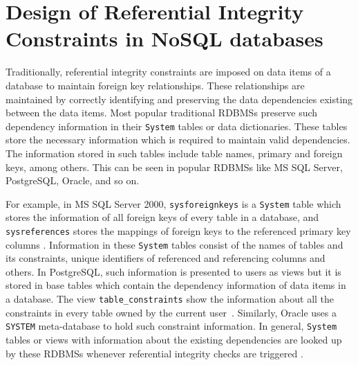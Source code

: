 \chapter{Design of Referential Integrity Constraints in NoSQL
databases} \label{c:solutions}

Traditionally,   referential
integrity constraints are imposed on data items of a database to maintain
foreign key relationships.    These relationships are
 maintained by correctly identifying and preserving the data dependencies 
 existing between the data items.   
Most popular traditional \acp{RDBMS}
preserve such dependency information in their \texttt{System} tables or data
dictionaries.     These tables store the necessary information  which is required
to maintain valid dependencies.    The information stored in such tables include table
names,    primary and foreign keys,  among others.   
This can be seen in popular \acp{RDBMS} like  MS SQL Server,    PostgreSQL,  
Oracle,   and so on.     

For example,    in MS SQL Server 2000,   \texttt{sysforeignkeys} is a
\texttt{System} table which stores the information of all foreign keys of every
table in a database,   and \texttt{sysreferences} stores the mappings of  foreign
keys to the referenced primary key columns \citep{msdn}.  Information in these
\texttt{System} tables consist of  the names of tables and its constraints, 
unique identifiers of referenced and referencing columns and others.  In
PostgreSQL,   such information is presented to users as views but it is stored in
base tables which contain the dependency information of data items in a
database.  The view \texttt{table\_constraints} show the information about all
the constraints in every table owned by the current user~\citep{postgres}. 
Similarly,   Oracle uses a \texttt{SYSTEM} meta-database to hold such constraint
information.   In general,   \texttt{System} tables or views with information
about the existing dependencies  are looked up by these \acp{RDBMS} whenever
referential integrity checks are triggered \citep{msdn}. 


